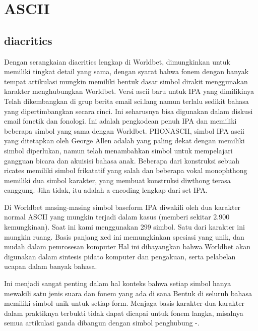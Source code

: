 \section{ASCII}
	\subsection{diacritics}
	Dengan serangkaian diacritics lengkap di Worldbet, dimungkinkan untuk memiliki tingkat detail yang sama,
dengan syarat bahwa fonem dengan banyak tempat artikulasi mungkin memiliki bentuk dasar
simbol dirakit menggunakan karakter menghubungkan Worldbet. Versi ascii baru untuk IPA yang dimilikinya
Telah dikembangkan di grup berita email sci.lang namun terlalu sedikit bahasa yang dipertimbangkan secara rinci. Ini seharusnya bisa digunakan dalam diskusi email
fonetik dan fonologi. Ini adalah pengkodean penuh IPA dan memiliki beberapa simbol yang sama dengan
Worldbet.
PHONASCII, simbol IPA ascii yang ditetapkan oleh George Allen adalah yang paling dekat dengan memiliki simbol
diperlukan, namun telah menambahkan simbol untuk mempelajari gangguan bicara dan akuisisi bahasa anak. Beberapa
dari konstruksi sebuah ricates memiliki simbol frikatatif yang salah dan beberapa vokal monophthong
memiliki dua simbol karakter, yang membuat konstruksi diwthong terasa canggung. Jika tidak, itu adalah a
encoding lengkap dari set IPA.

	Di Worldbet masing-masing simbol baseform IPA diwakili oleh dua karakter normal ASCII yang
mungkin terjadi dalam kasus (memberi sekitar 2.900 kemungkinan). Saat ini kami menggunakan 299 simbol. Satu dari
karakter ini mungkin ruang. Basis panjang xed ini memungkinkan spesiasi yang unik, dan mudah
dalam pemrosesan komputer Hal ini dibayangkan bahwa Worldbet akan digunakan dalam sintesis pidato komputer dan
pengakuan, serta pelabelan ucapan dalam banyak bahasa.

Ini menjadi sangat penting dalam hal konteks bahwa setiap simbol hanya mewakili satu jenis suara dan fonem yang ada di sana
Bentuk di seluruh bahasa memiliki simbol unik untuk setiap form. Menjaga basis karakter dua karakter
dalam praktiknya terbukti tidak dapat dicapai untuk fonem langka, misalnya semua artikulasi ganda
dibangun dengan simbol penghubung -. 
